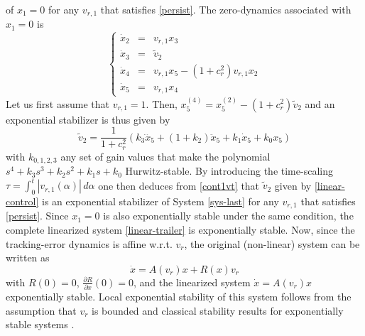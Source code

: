 \documentclass[a4paper,twoside]{article}
\def \finproof{\hfill\hbox{\vrule width1.0ex height1.5ex}}
\begin{document}
of $x_1=0$ for any $v_{r,1}$ that satisfies \eqref{persist}. The zero-dynamics associated with $x_1=0$ is
\begin{equation}
\label{sys-last}
\left \{
\begin{array}{lcl}
\dot x_2 & = &  v_{r,1} x_3  \\
\dot x_3 & = & \tilde v_2 \\
\dot x_4 & = &  v_{r,1} x_5 -  (1+c_r^2)  v_{r,1} x_2 \\
\dot x_5 & = &  v_{r,1} x_4
\end{array}
\right.
\end{equation}
Let us first assume that $v_{r,1}=1$. Then, $x_5^{(4)} = x_5^{(2)} -(1+ c_r^2) \tilde v_2$ and an exponential stabilizer 
is thus given by
\begin{equation}
\label{cont1vt}
\tilde v_2 = \frac{1}{1+ c_r^2} \left( k_3 \dddot x_5 + (1+k_2) \ddot x_5 +k_1 \dot x_5 + k_0 x_5 \right)
\end{equation}
with $k_{0,1,2,3}$ any set of gain values that make the polynomial $s^4+k_3s^3+k_2 s^2 + k_1 s + k_0$ 
Hurwitz-stable. By introducing the time-scaling  $\tau = \int_0^t |v_{r,1}(\alpha)| \, d \alpha$ one then deduces
from \eqref{cont1vt} that $\tilde v_2$ given by \eqref{linear-control} is an exponential stabilizer of System \eqref{sys-last} 
for any $v_{r,1}$ that satisfies \eqref{persist}.
 Since $x_1=0$ is also exponentially stable under the same condition, the complete linearized system \eqref{linear-trailer} is 
exponentially stable. Now, since the tracking-error dynamics is affine w.r.t. $v_r$, the original (non-linear) system can
be written as
\[
\dot x = A(v_r) x +R(x) v_r
\]
with $R(0)= 0$, $\frac{\partial R}{\partial x}(0)=0$, and the linearized system $\dot x =A(v_r) x$ exponentially stable.
Local exponential stability of this system follows from the assumption that $v_r$ is bounded and classical stability
results for exponentially stable systems \cite[Th. 4.13]{kh02}. \finproof



% 
	\newpage
\end{document}
